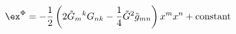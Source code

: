 \begin{equation}
   \ex^\Phi = -\frac{1}{2}\left(
         2\tilde G_{m}{}^kG_{nk}-\frac{1}{4}\tilde G^2 \tilde g_{mn}
         \right)x^m x^n
      + \text{constant} 
\end{equation}

